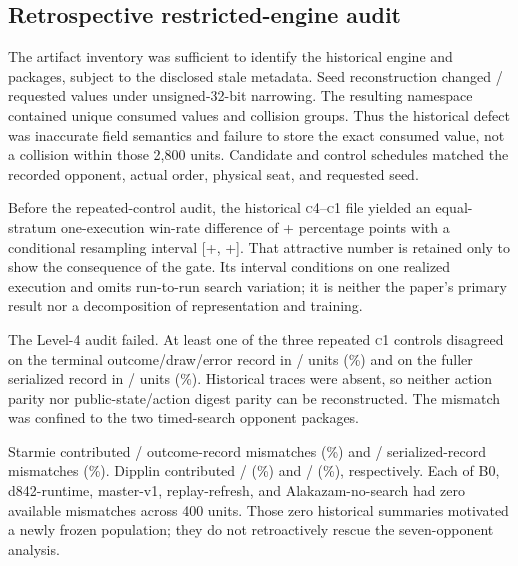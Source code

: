\documentclass[aps,reprint,superscriptaddress,longbibliography,floatfix]{revtex4-2}
\newcommand{\COne}{\textsc{c1}}
\newcommand{\CFour}{\textsc{c4}}
\newcommand{\pp}{percentage points}
\begin{document}
\subsection{Retrospective restricted-engine audit}

The artifact inventory was sufficient to identify the historical engine and
packages, subject to the disclosed stale metadata.  Seed reconstruction changed
\PEVLHistoricalNarrowedSeeds{}/\PEVLHistoricalUnits{} requested values under
unsigned-32-bit narrowing.  The resulting namespace contained
\PEVLHistoricalUniqueEngineSeeds{} unique consumed values and
\PEVLHistoricalSeedCollisions{} collision groups.  Thus the historical defect
was inaccurate field semantics and failure to store the exact consumed value,
not a collision within those 2,800 units.  Candidate and control schedules
matched the recorded opponent, actual order, physical seat, and requested seed.

Before the repeated-control audit, the historical \CFour--\COne{} file yielded
an equal-stratum one-execution win-rate difference of
+\PEVLHistoricalEffectPP{} \pp{} with a conditional resampling interval
[+\PEVLHistoricalCILowPP{}, +\PEVLHistoricalCIHighPP{}].  That attractive
number is retained only to show the consequence of the gate.  Its interval
conditions on one realized execution and omits run-to-run search variation; it
is neither the paper's primary result nor a decomposition of representation and
training.

The Level-4 audit failed.  At least one of the three repeated \COne{} controls
disagreed on the terminal outcome/draw/error record in
\PEVLHistoricalOutcomeMismatch{}/\PEVLHistoricalUnits{} units
(\PEVLHistoricalOutcomeMismatchPct\%) and on the fuller serialized record in
\PEVLHistoricalSerializedMismatch{}/\PEVLHistoricalUnits{} units
(\PEVLHistoricalSerializedMismatchPct\%).  Historical traces were absent, so
neither action parity nor public-state/action digest parity can be reconstructed.
The mismatch was confined to the two timed-search opponent packages.

Starmie contributed \PEVLStarmieOutcomeMismatch{}/\PEVLStarmieUnits{}
outcome-record mismatches (\PEVLStarmieOutcomeMismatchPct\%) and
\PEVLStarmieSerializedMismatch{}/\PEVLStarmieUnits{} serialized-record
mismatches (\PEVLStarmieSerializedMismatchPct\%).  Dipplin contributed
\PEVLDipplinOutcomeMismatch{}/\PEVLDipplinUnits{}
(\PEVLDipplinOutcomeMismatchPct\%) and
\PEVLDipplinSerializedMismatch{}/\PEVLDipplinUnits{}
(\PEVLDipplinSerializedMismatchPct\%), respectively.  Each of B0,
d842-runtime, master-v1, replay-refresh, and Alakazam-no-search had zero
available mismatches across 400 units.  Those zero historical summaries
motivated a newly frozen population; they do not retroactively rescue the
seven-opponent analysis.
\end{document}
